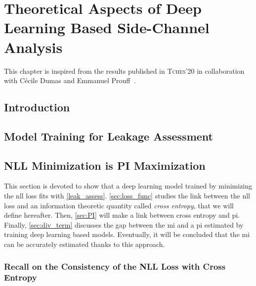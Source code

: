 \chapter{Theoretical Aspects of Deep Learning Based Side-Channel Analysis}
\label{chap:ches_20}
This chapter is inspired from the results published in \textsc{Tches}'20 in collaboration with Cécile Dumas and Emmanuel Prouff~\cite{masure_comprehensive_2019}.
\minitoc
\newpage
\section{Introduction}
    \label{sec:intro_ches}
    

\section{Model Training for Leakage Assessment}
    \label{sec:leakage_assess}
    

\section{NLL Minimization is PI Maximization}
    \label{sec:no_free_lunch}
    This section is devoted to show that a deep learning model trained by minimizing the \gls{nll} loss fits with \autoref{leak_assess}.
    \autoref{sec:loss_func} studies the link between the \gls{nll} loss and an information theoretic quantity called \emph{cross entropy}, that we will define hereafter.
    Then, \autoref{sec:PI} will make a link between cross entropy and \gls{pi}.
    Finally, \autoref{sec:div_term} discusses the gap between the \gls{mi} and a \gls{pi} estimated by training deep learning based models.
    Eventually, it will be concluded that the \gls{mi} can be accurately estimated thanks to this approach.
    \subsection{Recall on the Consistency of the NLL Loss with Cross Entropy}
    \label{sec:loss_func}
    

